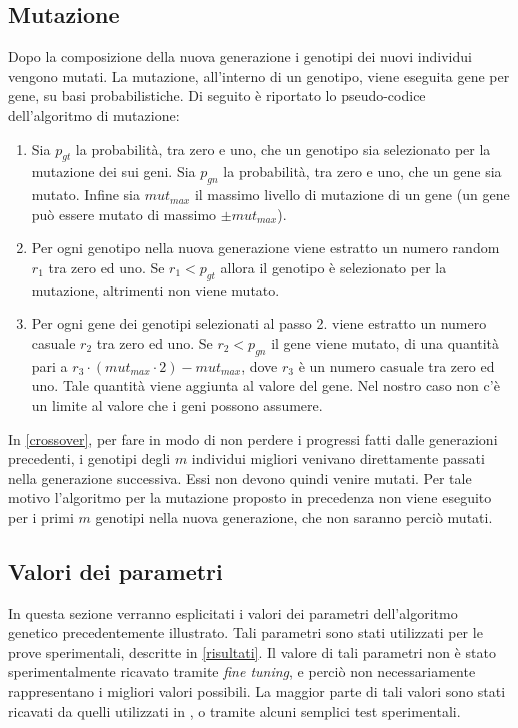 \documentclass[a4paper,12pt]{article}
\begin{document}
\subsection{Mutazione} \label{mutazione}
Dopo la composizione della nuova generazione i genotipi dei nuovi individui vengono mutati. La mutazione, all'interno di un genotipo, viene eseguita gene per gene, su basi probabilistiche. Di seguito è riportato lo pseudo-codice dell'algoritmo di mutazione:
\begin{enumerate}
	\item Sia $p_{gt}$ la probabilità, tra zero e uno, che un genotipo sia selezionato per la mutazione dei sui geni. Sia $p_{gn}$ la probabilità, tra zero e uno, che un gene sia mutato. Infine sia $mut_{max}$ il massimo livello di mutazione di un gene (un gene può essere mutato di massimo $\pm mut_{max}$).
	\item Per ogni genotipo nella nuova generazione viene estratto un numero random $r_1$ tra zero ed uno. Se $r_1 < p_{gt}$ allora il genotipo è selezionato per la mutazione, altrimenti non viene mutato.
	\item Per ogni gene dei genotipi selezionati al passo 2. viene estratto un numero casuale $r_2$ tra zero ed uno. Se $r_2 < p_{gn}$ il gene viene mutato, di una quantità pari a $r_3 \cdot (mut_{max} \cdot 2) - mut_{max}$, dove $r_3$ è un numero casuale tra zero ed uno. Tale quantità viene aggiunta al valore del gene. Nel nostro caso non c'è un limite al valore che i geni possono assumere. 
\end{enumerate}
In \autoref{crossover}, per fare in modo di non perdere i progressi fatti dalle generazioni precedenti, i genotipi degli $m$ individui migliori venivano direttamente passati nella generazione successiva. Essi non devono quindi venire mutati. Per tale motivo l'algoritmo per la mutazione proposto in precedenza non viene eseguito per i primi $m$ genotipi nella nuova generazione, che non saranno perciò mutati.
\subsection{Valori dei parametri}
In questa sezione verranno esplicitati i valori dei parametri dell'algoritmo genetico precedentemente illustrato. Tali parametri sono stati utilizzati per le prove sperimentali, descritte in \autoref{risultati}. Il valore di tali parametri non è stato sperimentalmente ricavato tramite \emph{fine tuning}, e perciò non necessariamente rappresentano i migliori valori possibili. La maggior parte di tali valori sono stati ricavati da quelli utilizzati in \cite{arztRepo}, o tramite alcuni semplici test sperimentali.
\end{document}
